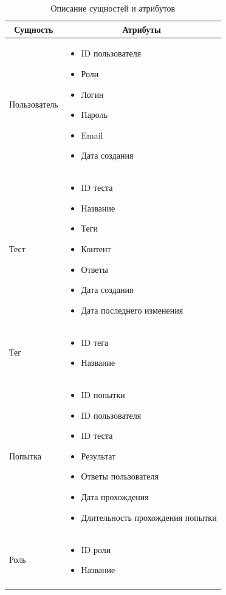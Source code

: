 \begin{longtable}[c]{|l|p{6.5cm}|}
    \hline
    \multicolumn{1}{|c|}{\textbf{Сущность}} & \multicolumn{1}{c|}{\textbf{Атрибуты}}
    \\ \hline
    Пользователь & \begin{itemize}
        \item ID пользователя
        \item Роли
        \item Логин
        \item Пароль
        \item Email
        \item Дата создания
    \end{itemize} \\ \hline
    Тест & \begin{itemize}
        \item ID теста
        \item Название
        \item Теги
        \item Контент
        \item Ответы
        \item Дата создания
        \item Дата последнего изменения
    \end{itemize} \\ \hline
    Тег & \begin{itemize}
        \item ID тега
        \item Название
    \end{itemize}
    \\ \hline
    Попытка & \begin{itemize}
        \item ID попытки
        \item ID пользователя
        \item ID теста
        \item Результат
        \item Ответы пользователя
        \item Дата прохождения
        \item Длительность прохождения попытки
    \end{itemize}
    \\ \hline
    Роль & \begin{itemize}
        \item ID роли
        \item Название
    \end{itemize}
    \\ \hline
    \caption{Описание сущностей и атрибутов}
\end{longtable}

